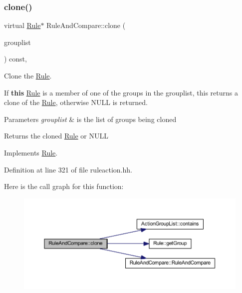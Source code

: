 \subsubsection{\texorpdfstring{clone()}{clone()}}
{\footnotesize\ttfamily virtual \mbox{\hyperlink{class_rule}{Rule}}$\ast$ Rule\+And\+Compare\+::clone (\begin{DoxyParamCaption}\item[{const \mbox{\hyperlink{class_action_group_list}{Action\+Group\+List}} \&}]{grouplist }\end{DoxyParamCaption}) const\hspace{0.3cm}{\ttfamily [inline]}, {\ttfamily [virtual]}}



Clone the \mbox{\hyperlink{class_rule}{Rule}}. 

If {\bfseries{this}} \mbox{\hyperlink{class_rule}{Rule}} is a member of one of the groups in the grouplist, this returns a clone of the \mbox{\hyperlink{class_rule}{Rule}}, otherwise N\+U\+LL is returned. 
\begin{DoxyParams}{Parameters}
{\em grouplist} & is the list of groups being cloned \\
\hline
\end{DoxyParams}
\begin{DoxyReturn}{Returns}
the cloned \mbox{\hyperlink{class_rule}{Rule}} or N\+U\+LL 
\end{DoxyReturn}


Implements \mbox{\hyperlink{class_rule_a70de90a76461bfa7ea0b575ce3c11e4d}{Rule}}.



Definition at line 321 of file ruleaction.\+hh.

Here is the call graph for this function\+:
\nopagebreak
\begin{figure}[H]
\begin{center}
\leavevmode
\includegraphics[width=350pt]{class_rule_and_compare_a9ae35d0a775af1e5d057c0d6cf1d4860_cgraph}
\end{center}
\end{figure}
\mbox{\label{class_rule_and_compare_abe15ea639507c25e7ff33823f986e971}} 
